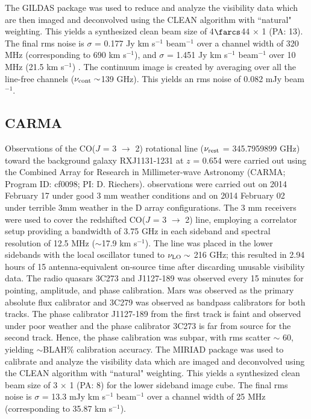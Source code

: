 \documentclass[]{emulateapj}
\begin{document}
The GILDAS package was used to reduce and analyze the visibility data which are
then imaged and deconvolved using
the CLEAN algorithm with ``natural" weighting. This yields a synthesized clean
beam size of 4$\farcs$44 $\times$ 1 (PA: 13\degr). The final rms noise is $\sigma$ =
0.177 
Jy km s$^{-1}$ beam$^{-1}$ over a channel width of 320 MHz (corresponding to
690 km s$^{-1}$), and $\sigma$ = 1.451 Jy km s$^{-1}$ beam$^{-1}$ over 10 MHz 
(21.5 km s$^{-1}$) . 
The continuum image is created by %
averaging over all the line-free channels ($\nu_{\rm cont}\sim$139 GHz). This
yields an rms noise of 0.082 mJy beam$^{-1}$. %

\subsection{CARMA} \label{sec:carmadata}
%
Observations of the CO($J$ = 3 $\rightarrow$ 2) rotational line ($\nu_{\rm
rest}$ = 345.7959899 GHz) toward the background galaxy RXJ1131-1231 at $z$ = 
0.654
 were carried out using the Combined Array for Research in Millimeter-wave
Astronomy (CARMA; Program ID: cf0098; PI: D. Riechers).
observations were carried out on 2014 February 17 under good 3 mm weather
conditions and on 2014 February 02 under terrible 3mm weather in the D array
configurations.  The 3 mm receivers were used to cover
the 
redshifted CO($J$ = 3 $\rightarrow$ 2) line, employing a correlator setup
providing a bandwidth of 3.75 GHz in each sideband and spectral resolution of
12.5 MHz ($
\sim$17.9 km s$^{-1}$). The line was placed in the
lower sidebands with the local oscillator tuned to $\nu_{\rm LO}\sim$ 216 GHz;
this resulted in 2.94 hours of 15 antenna-equivalent on-source time after
discarding 
unusable visibility data. 
The radio quasars 3C273 and J1127-189 was observed every 15 minutes for
pointing, amplitude, and phase calibration. Mars was observed as the
primary
absolute flux calibrator and 3C279 was observed as bandpass calibrators for
both tracks. 
The phase calibrator J1127-189 from the first track is faint and observed under
poor weather and the phase calibrator 3C273 is far from source for the second
track. Hence, the phase calibration was 
subpar, with rms scatter $\sim$ 60\degr, 
yielding
$\sim
$BLAH\% calibration accuracy.
%
The MIRIAD package was used to calibrate and analyze the visibility data which
are imaged and deconvolved using
the CLEAN algorithm with ``natural" weighting. This yields a synthesized clean
beam size of 3 $\times$ 1 (PA: 8\degr) for the lower sideband
image cube. The
final 
rms noise is $\sigma$ = 13.3 mJy km s$^{-1}$ beam$^{-1}$ over a channel width
of
25 MHz (corresponding to 35.87 km s$^{-1}$). 
\end{document}
